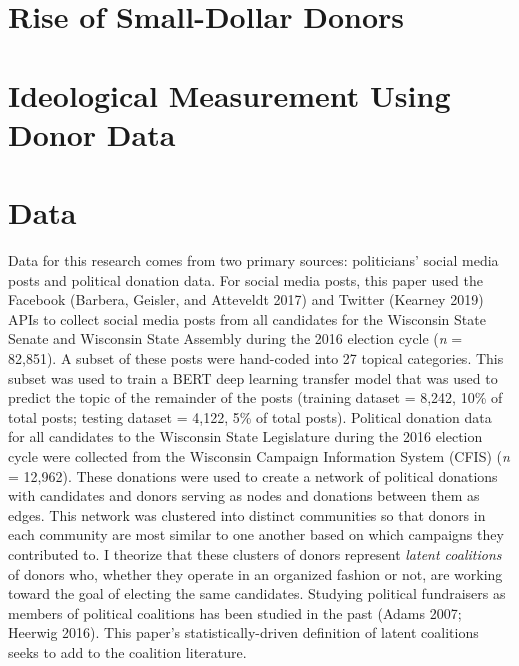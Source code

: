 \documentclass[12pt,]{article}
\begin{document}
\hypertarget{rise-of-small-dollar-donors}{%
\section{Rise of Small-Dollar
Donors}\label{rise-of-small-dollar-donors}}

\hypertarget{ideological-measurement-using-donor-data}{%
\section{Ideological Measurement Using Donor
Data}\label{ideological-measurement-using-donor-data}}

\hypertarget{data}{%
\section{Data}\label{data}}

Data for this research comes from two primary sources: politicians'
social media posts and political donation data. For social media posts,
this paper used the Facebook (Barbera, Geisler, and Atteveldt 2017) and
Twitter (Kearney 2019) APIs to collect social media posts from all
candidates for the Wisconsin State Senate and Wisconsin State Assembly
during the 2016 election cycle (\emph{n} = 82,851). A subset of these
posts were hand-coded into 27 topical categories. This subset was used
to train a BERT deep learning transfer model that was used to predict
the topic of the remainder of the posts (training dataset = 8,242, 10\%
of total posts; testing dataset = 4,122, 5\% of total posts). Political
donation data for all candidates to the Wisconsin State Legislature
during the 2016 election cycle were collected from the Wisconsin
Campaign Information System (CFIS) (\emph{n} = 12,962). These donations
were used to create a network of political donations with candidates and
donors serving as nodes and donations between them as edges. This
network was clustered into distinct communities so that donors in each
community are most similar to one another based on which campaigns they
contributed to. I theorize that these clusters of donors represent
\emph{latent coalitions} of donors who, whether they operate in an
organized fashion or not, are working toward the goal of electing the
same candidates. Studying political fundraisers as members of political
coalitions has been studied in the past (Adams 2007; Heerwig 2016). This
paper's statistically-driven definition of latent coalitions seeks to
add to the coalition literature.
\end{document}
